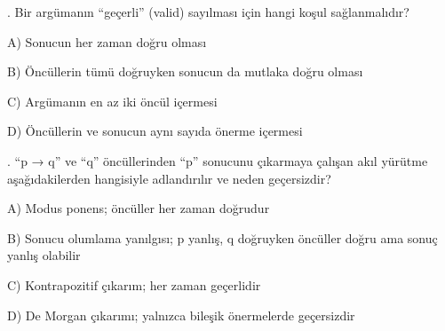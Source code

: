 \par\smallskip{}. Bir argümanın “geçerli” (valid) sayılması için hangi koşul sağlanmalıdır?

\par\noindent\hspace*{1.6em}A) Sonucun her zaman doğru olması

\par\noindent\hspace*{1.6em}B) Öncüllerin tümü doğruyken sonucun da mutlaka doğru olması

\par\noindent\hspace*{1.6em}C) Argümanın en az iki öncül içermesi

\par\noindent\hspace*{1.6em}D) Öncüllerin ve sonucun aynı sayıda önerme içermesi

\par\smallskip{}. “p → q” ve “q” öncüllerinden “p” sonucunu çıkarmaya çalışan akıl yürütme aşağıdakilerden hangisiyle adlandırılır ve neden geçersizdir?

\par\noindent\hspace*{1.6em}A) Modus ponens; öncüller her zaman doğrudur

\par\noindent\hspace*{1.6em}B) Sonucu olumlama yanılgısı; p yanlış, q doğruyken öncüller doğru ama sonuç yanlış olabilir

\par\noindent\hspace*{1.6em}C) Kontrapozitif çıkarım; her zaman geçerlidir

\par\noindent\hspace*{1.6em}D) De Morgan çıkarımı; yalnızca bileşik önermelerde geçersizdir

\clearpage

\clearpage
